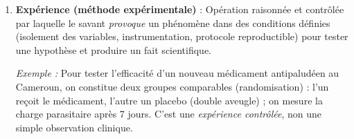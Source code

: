 \documentclass[11pt]{article}
\newcommand{\cle}[1]{{\popxbold\color{popdark}#1}}
\begin{document}
\begin{corrige}
\begin{enumerate}
\item \textbf{\cle{Expérience} (méthode expérimentale)} : Opération raisonnée et contrôlée par laquelle le savant \emph{provoque} un phénomène dans des conditions définies (isolement des variables, instrumentation, protocole reproductible) pour tester une hypothèse et produire un fait scientifique.
\par\emph{Exemple :} Pour tester l'efficacité d'un nouveau médicament antipaludéen au Cameroun, on constitue deux groupes comparables (randomisation) : l'un reçoit le médicament, l'autre un placebo (double aveugle) ; on mesure la charge parasitaire après 7 jours. C'est une \emph{expérience contrôlée}, non une simple observation clinique.
\end{enumerate}
\end{corrige}
\end{document}
